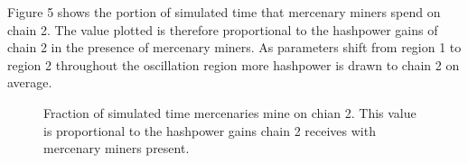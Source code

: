 \documentclass[10pt, preprint]{aastex}
\begin{document}
Figure 5 shows the portion of simulated time that mercenary miners spend on chain 2.  The value plotted is therefore proportional to the hashpower gains of chain 2 in the presence of mercenary miners.  As parameters shift from region 1 to region 2 throughout the oscillation region more hashpower is drawn to chain 2 on average.
\begin{figure}
	\centering
	\qquad
	\qquad
	\qquad
	\qquad
	\caption{Fraction of simulated time mercenaries mine on chian 2.  This value is proportional to the hashpower gains chain 2 receives with mercenary miners present.}
\end{figure}
\end{document}
